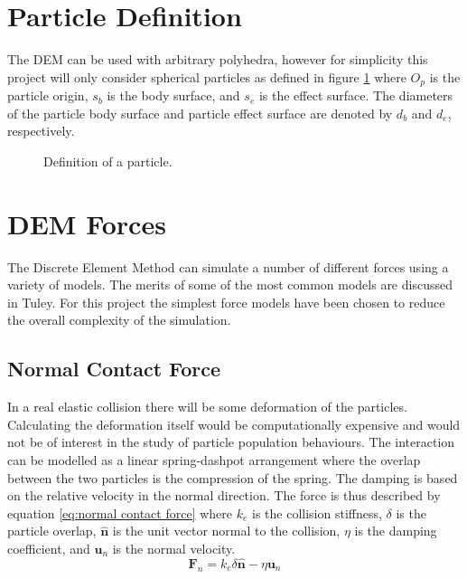 \documentclass[10pt,a4paper,titlepage]{report}
\begin{document}
\section{Particle Definition}
The DEM can be used with arbitrary polyhedra, however for simplicity this project will only consider spherical particles as defined in figure \ref{fig:particle} where $O_p$ is the particle origin, $s_b$ is the body surface, and $s_e$ is the effect surface. The diameters of the particle body surface and particle effect surface are denoted by $d_b$ and $d_e$, respectively.
\begin{figure}[!ht]
\centering

\caption{Definition of a particle.}
\label{fig:particle}
\end{figure}
\section{DEM Forces}
\label{sec:DEM Forces}
The Discrete Element Method can simulate a number of different forces using a variety of models. The merits of some of the most common models are discussed in Tuley\cite{tuley}. For this project the simplest force models have been chosen to reduce the overall complexity of the simulation.
\subsection{Normal Contact Force}
In a real elastic collision there will be some deformation of the particles. Calculating the deformation itself would be computationally expensive and would not be of interest in the study of particle population behaviours. The interaction can be modelled as a linear spring-dashpot arrangement where the overlap between the two particles is the compression of the spring. The damping is based on the relative velocity in the normal direction. The force is thus described by equation \ref{eq:normal contact force} where $k_{e}$ is the collision stiffness, $\delta$ is the particle overlap, $\mathbf{\hat{n}}$ is the unit vector normal to the collision, $\eta$ is the damping coefficient, and $\mathbf{u}_{n}$ is the normal velocity.%
\begin{equation}
\mathbf{F}_{n} = k_{e} \delta \mathbf{\hat{n}} - \eta \mathbf{u}_{n}
\label{eq:normal contact force}
\end{equation}
\end{document}
